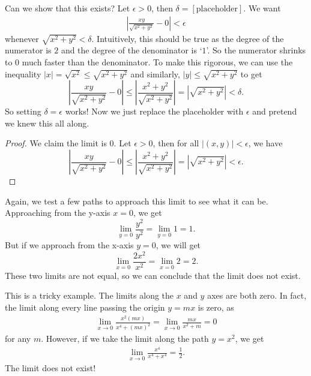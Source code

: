 Can we show that this exists? Let $\epsilon>0$, then $\delta=[\textrm{placeholder}]$. We want \begin{align*}
    \left|\frac{xy}{\sqrt{x^2+y^2}}-0\right|<\epsilon
\end{align*} whenever $\sqrt{x^2+y^2}<\delta$. Intuitively, this should be true as the degree of the numerator is $2$ and the degree of the denominator is `$1$'. So the numerator shrinks to $0$ much faster than the denominator. To make this rigorous, we can use the inequality $|x|=\sqrt{x^2}\leq \sqrt{x^2+y^2}$ and similarly, $|y|\leq \sqrt{x^2+y^2}$ to get \[
    \left|\frac{xy}{\sqrt{x^2+y^2}}-0\right|\leq\left|\frac{x^2+y^2}{\sqrt{x^2+y^2}}\right|
    =\left|\sqrt{x^2+y^2}\right|<\delta.
\]
So setting $\delta=\epsilon$ works! Now we just replace the placeholder with $\epsilon$ and pretend we knew this all along.
\begin{proof}
    We claim the limit is $0$. Let $\epsilon>0$, then for all $|(x,y)|<\epsilon$, we have  \[
        \left|\frac{xy}{\sqrt{x^2+y^2}}-0\right|\leq\left|\frac{x^2+y^2}{\sqrt{x^2+y^2}}\right|
        =\left|\sqrt{x^2+y^2}\right|<\epsilon.
    \]
\end{proof}
Again, we test a few paths to approach this limit to see what it can be.
Approaching from the y-axis $x=0$, we get \[
\lim_{y=0}\frac{y^2}{y^2}=\lim_{y=0}1 =1.
\]
But if we approach from the x-axis $y=0$, we will get\[
    \lim_{x=0}\frac{2x^2}{x^2}=\lim_{x=0}2 =2.
\]
These two limits are not equal, so we can conclude that the limit does not exist.

This is a tricky example. The limits along the $x$ and $y$ axes are both zero.
In fact, the limit along every line passing the origin $y=mx$ is zero, as \begin{align*}
    \lim_{x\to 0}\frac{x^2 (mx)}{x^4+(mx)^2} =  \lim_{x\to 0}\frac{mx}{x^2+m}= 0
\end{align*}
for any $m$. 
However, if we take the limit along the path $y=x^2$, we get \begin{align*}
    \lim_{x\to 0}\frac{x^4 }{x^4+x^4} = \frac{1}{2}.
\end{align*}
The limit does not exist! 


